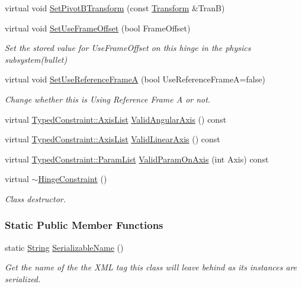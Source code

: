 \begin{DoxyCompactItemize}
virtual void \hyperlink{classphys_1_1HingeConstraint_a79ef3dc47fa94a7a9f98f7934e786a6b}{SetPivotBTransform} (const \hyperlink{classphys_1_1Transform}{Transform} \&TranB)
\item 
virtual void \hyperlink{classphys_1_1HingeConstraint_a3452b2c810cc0fb814f1158306e2b155}{SetUseFrameOffset} (bool FrameOffset)
\begin{DoxyCompactList}\small\item\em Set the stored value for UseFrameOffset on this hinge in the physics subsystem(bullet) \item\end{DoxyCompactList}\item 
virtual void \hyperlink{classphys_1_1HingeConstraint_ac1771e0f44124fc84b2f847fde10cb15}{SetUseReferenceFrameA} (bool UseReferenceFrameA=false)
\begin{DoxyCompactList}\small\item\em Change whether this is Using Reference Frame A or not. \item\end{DoxyCompactList}\item 
virtual \hyperlink{classphys_1_1TypedConstraint_a26261a4055e84e104c58d84eea5667c2}{TypedConstraint::AxisList} \hyperlink{classphys_1_1HingeConstraint_aceb0c3739cbde8692e4aad5695de9306}{ValidAngularAxis} () const 
\item 
virtual \hyperlink{classphys_1_1TypedConstraint_a26261a4055e84e104c58d84eea5667c2}{TypedConstraint::AxisList} \hyperlink{classphys_1_1HingeConstraint_ab3316794eec67ca2a9c1b11925e64e23}{ValidLinearAxis} () const 
\item 
virtual \hyperlink{classphys_1_1TypedConstraint_a4c2dcea3fbb764e454840329126d034e}{TypedConstraint::ParamList} \hyperlink{classphys_1_1HingeConstraint_a7fd949b157deabe3b955fd618134b1de}{ValidParamOnAxis} (int Axis) const 
\item 
virtual \hyperlink{classphys_1_1HingeConstraint_a242cdfc8ab59d608bfbd9290119d81d9}{$\sim$HingeConstraint} ()
\begin{DoxyCompactList}\small\item\em Class destructor. \item\end{DoxyCompactList}\end{DoxyCompactItemize}
\subsubsection*{Static Public Member Functions}
\begin{DoxyCompactItemize}
\item 
static \hyperlink{namespacephys_aa03900411993de7fbfec4789bc1d392e}{String} \hyperlink{classphys_1_1HingeConstraint_ae7007bcfb6b84b234264e35fd5d7ae91}{SerializableName} ()
\begin{DoxyCompactList}\small\item\em Get the name of the the XML tag this class will leave behind as its instances are serialized. \item\end{DoxyCompactList}\end{DoxyCompactItemize}
